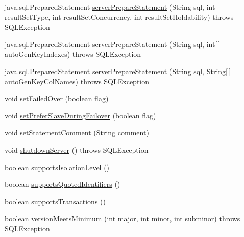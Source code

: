 \begin{DoxyCompactItemize}
\item 
java.\+sql.\+Prepared\+Statement \mbox{\hyperlink{classcom_1_1mysql_1_1jdbc_1_1jdbc2_1_1optional_1_1_connection_wrapper_aa5144167983b1257bdf575d8349e1fbe}{server\+Prepare\+Statement}} (String sql, int result\+Set\+Type, int result\+Set\+Concurrency, int result\+Set\+Holdability)  throws S\+Q\+L\+Exception 
\item 
java.\+sql.\+Prepared\+Statement \mbox{\hyperlink{classcom_1_1mysql_1_1jdbc_1_1jdbc2_1_1optional_1_1_connection_wrapper_a4625dbf11fc977f96a2da25c00c2a396}{server\+Prepare\+Statement}} (String sql, int\mbox{[}$\,$\mbox{]} auto\+Gen\+Key\+Indexes)  throws S\+Q\+L\+Exception 
\item 
java.\+sql.\+Prepared\+Statement \mbox{\hyperlink{classcom_1_1mysql_1_1jdbc_1_1jdbc2_1_1optional_1_1_connection_wrapper_ab46a28f09e096cc8901db389bc4e6016}{server\+Prepare\+Statement}} (String sql, String\mbox{[}$\,$\mbox{]} auto\+Gen\+Key\+Col\+Names)  throws S\+Q\+L\+Exception 
\item 
void \mbox{\hyperlink{classcom_1_1mysql_1_1jdbc_1_1jdbc2_1_1optional_1_1_connection_wrapper_a5ca644a1dbabdfa779153552d47fc826}{set\+Failed\+Over}} (boolean flag)
\item 
void \mbox{\hyperlink{classcom_1_1mysql_1_1jdbc_1_1jdbc2_1_1optional_1_1_connection_wrapper_a41e30138708f151589417be4f59e8c59}{set\+Prefer\+Slave\+During\+Failover}} (boolean flag)
\item 
void \mbox{\hyperlink{classcom_1_1mysql_1_1jdbc_1_1jdbc2_1_1optional_1_1_connection_wrapper_a31c5d98ba9578549f71ddae31c27fc7b}{set\+Statement\+Comment}} (String comment)
\item 
void \mbox{\hyperlink{classcom_1_1mysql_1_1jdbc_1_1jdbc2_1_1optional_1_1_connection_wrapper_a23e3bc174ec3f98397698fcddc3d3ca0}{shutdown\+Server}} ()  throws S\+Q\+L\+Exception 
\item 
boolean \mbox{\hyperlink{classcom_1_1mysql_1_1jdbc_1_1jdbc2_1_1optional_1_1_connection_wrapper_a836c27d27eac131a9226e44e4e57672f}{supports\+Isolation\+Level}} ()
\item 
boolean \mbox{\hyperlink{classcom_1_1mysql_1_1jdbc_1_1jdbc2_1_1optional_1_1_connection_wrapper_aee329f3049dfe677c6baa7454004bd2a}{supports\+Quoted\+Identifiers}} ()
\item 
boolean \mbox{\hyperlink{classcom_1_1mysql_1_1jdbc_1_1jdbc2_1_1optional_1_1_connection_wrapper_a1f15bbe2ddf9ab93df95fd71932a0908}{supports\+Transactions}} ()
\item 
boolean \mbox{\hyperlink{classcom_1_1mysql_1_1jdbc_1_1jdbc2_1_1optional_1_1_connection_wrapper_aa9d07d33f8163adfb5783228d7a86788}{version\+Meets\+Minimum}} (int major, int minor, int subminor)  throws S\+Q\+L\+Exception 

\end{DoxyCompactItemize}
